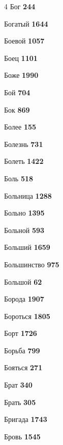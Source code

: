 \begin{multicols}{4}
\noindent Бог \dotfill \textbf{\color{secondary} 244}\par
\noindent Богатый \dotfill \textbf{\color{secondary} 1644}\par
\noindent Боевой \dotfill \textbf{\color{secondary} 1057}\par
\noindent Боец \dotfill \textbf{\color{secondary} 1101}\par
\noindent Боже \dotfill \textbf{\color{secondary} 1990}\par
\noindent Бой \dotfill \textbf{\color{secondary} 704}\par
\noindent Бок \dotfill \textbf{\color{secondary} 869}\par
\noindent Более \dotfill \textbf{\color{secondary} 155}\par
\noindent Болезнь \dotfill \textbf{\color{secondary} 731}\par
\noindent Болеть \dotfill \textbf{\color{secondary} 1422}\par
\noindent Боль \dotfill \textbf{\color{secondary} 518}\par
\noindent Больница \dotfill \textbf{\color{secondary} 1288}\par
\noindent Больно \dotfill \textbf{\color{secondary} 1395}\par
\noindent Больной \dotfill \textbf{\color{secondary} 593}\par
\noindent Больший \dotfill \textbf{\color{secondary} 1659}\par
\noindent Большинство \dotfill \textbf{\color{secondary} 975}\par
\noindent Большой \dotfill \textbf{\color{secondary} 62}\par
\noindent Борода \dotfill \textbf{\color{secondary} 1907}\par
\noindent Бороться \dotfill \textbf{\color{secondary} 1805}\par
\noindent Борт \dotfill \textbf{\color{secondary} 1726}\par
\noindent Борьба \dotfill \textbf{\color{secondary} 799}\par
\noindent Бояться \dotfill \textbf{\color{secondary} 271}\par
\noindent Брат \dotfill \textbf{\color{secondary} 340}\par
\noindent Брать \dotfill \textbf{\color{secondary} 305}\par
\noindent Бригада \dotfill \textbf{\color{secondary} 1743}\par
\noindent Бровь \dotfill \textbf{\color{secondary} 1545}\par

\end{multicols}
